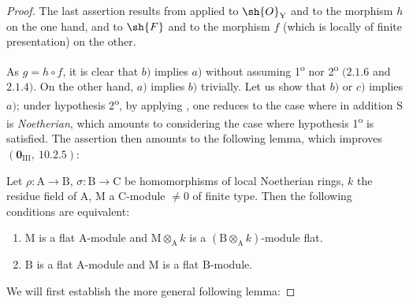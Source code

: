 \begin{proof}
The last assertion results from  applied to $\sh{O}_\mathrm{Y}$ and to the morphism $h$ on the one hand, and to $\sh{F}$ and to the morphism $f$ (which is locally of finite presentation) on the other.

As $g=h\circ f$, it is clear that $b)$ implies $a)$ without assuming 1\textsuperscript{o} nor 2\textsuperscript{o} $(2.1.6$ and $2.1.4)$. On the other hand, $a)$ implies $b)$ trivially. Let us show that $b)$ or $c)$ implies $a)$; under hypothesis 2\textsuperscript{o}, by applying , one reduces to the case where in addition $\mathrm{S}$ is \emph{Noetherian}, which amounts to considering the case where hypothesis 1\textsuperscript{o} is satisfied. The assertion then amounts to the following lemma, which improves $(\mathbf{0}_{\mathrm{III}},~10.2.5)$:

\begin{lemma}[11.3.10.1]
\label{IV.11.3.10.1}
Let $\rho:\mathrm{A}\to\mathrm{B}$, $\sigma:\mathrm{B}\to\mathrm{C}$ be homomorphisms of local Noetherian rings, $k$ the residue field of $\mathrm{A}$, $\mathrm{M}$ a $\mathrm{C}$-module $\neq 0$ of finite type. Then the following conditions are equivalent:
\begin{enumerate}[label=\emph{\alph*)}]
  \item $\mathrm{M}$ is a flat $\mathrm{A}$-module and $\mathrm{M}\otimes_\mathrm{A} k$ is a $(\mathrm{B}\otimes_\mathrm{A} k)$-module flat.
  \item $\mathrm{B}$ is a flat $\mathrm{A}$-module and $\mathrm{M}$ is a flat $\mathrm{B}$-module.
\end{enumerate}
\end{lemma}

We will first establish the more general following lemma:


\end{proof}
